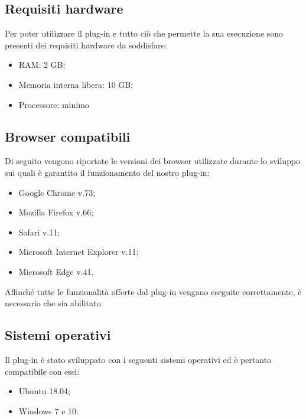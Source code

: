 \subsection{Requisiti hardware}
Per poter utilizzare il plug-in e tutto ciò che permette la sua esecuzione sono presenti dei requisiti hardware da soddisfare:
\begin{itemize}
	\item{RAM: 2 GB;}
	\item{Memoria interna libera: 10 GB;}
	\item{Processore: minimo } 
\end{itemize}
\subsection{Browser compatibili}
Di seguito vengono riportate le versioni dei browser utilizzate durante lo sviluppo sui quali è garantito il funzionamento del nostro plug-in:
\begin{itemize}
	\item{Google Chrome v.73;}
	\item{Mozilla Firefox v.66;}
	\item{Safari v.11;}
	\item{Microsoft Internet Explorer v.11;}
	\item{Microsoft Edge v.41.} \\
\end{itemize}

Affinché tutte le funzionalità offerte dal plug-in vengano eseguite correttamente, è necessario che  sia abilitato.

\subsection{Sistemi operativi}
Il plug-in è stato sviluppato con i seguenti sistemi operativi ed è pertanto compatibile con essi:
\begin{itemize}
	\item{Ubuntu 18.04;}
	\item{Windows 7 e 10.}
\end{itemize}

\pagebreak